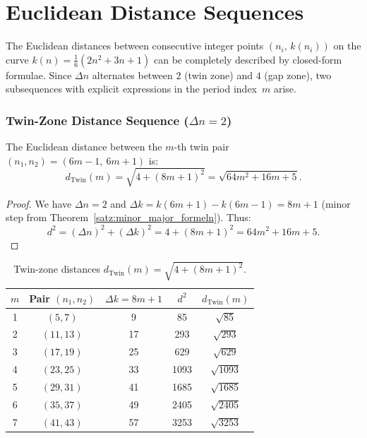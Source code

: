 \chapter{Euclidean Distance Sequences}
\label{sec:distanz_sequenzen}

The Euclidean distances between consecutive integer points
$(n_i,\, k(n_i))$ on the curve $k(n) = \frac{1}{6}(2n^2+3n+1)$ can
be completely described by closed-form formulae. Since $\Delta n$ alternates
between $2$ (twin zone) and $4$ (gap zone), two subsequences with explicit
expressions in the period index~$m$ arise.

\subsection{Twin-Zone Distance Sequence (\texorpdfstring{$\Delta n = 2$}{Δn=2})}

\begin{theorem}
\label{satz:twin_distanz}
The Euclidean distance between the $m$-th twin pair
$(n_1, n_2) = (6m-1,\ 6m+1)$ is:
\begin{equation}
  \boxed{
  d_{\mathrm{Twin}}(m)
  = \sqrt{4 + (8m+1)^2}
  = \sqrt{64m^2 + 16m + 5}.
  }
\end{equation}
\end{theorem}

\begin{proof}
We have $\Delta n = 2$ and $\Delta k = k(6m+1)-k(6m-1) = 8m+1$
(minor step from Theorem~\ref{satz:minor_major_formeln}). Thus:
\[
  d^2 = (\Delta n)^2 + (\Delta k)^2
      = 4 + (8m+1)^2
      = 64m^2+16m+5.
\]
\end{proof}

\begin{table}[H]
\centering
\caption{Twin-zone distances $d_{\mathrm{Twin}}(m) = \sqrt{4+(8m+1)^2}$.}
\renewcommand{\arraystretch}{1.15}
\begin{tabular}{ccccc}
\toprule
$m$ & Pair $(n_1, n_2)$ & $\Delta k = 8m+1$ & $d^2$ & $d_{\mathrm{Twin}}(m)$ \\
\midrule
1 & $( 5,  7)$ &  9 &   85 & $\sqrt{85}$   \\
2 & $(11, 13)$ & 17 &  293 & $\sqrt{293}$  \\
3 & $(17, 19)$ & 25 &  629 & $\sqrt{629}$  \\
4 & $(23, 25)$ & 33 & 1093 & $\sqrt{1093}$ \\
5 & $(29, 31)$ & 41 & 1685 & $\sqrt{1685}$ \\
6 & $(35, 37)$ & 49 & 2405 & $\sqrt{2405}$ \\
7 & $(41, 43)$ & 57 & 3253 & $\sqrt{3253}$ \\
\bottomrule
\end{tabular}
\end{table}

